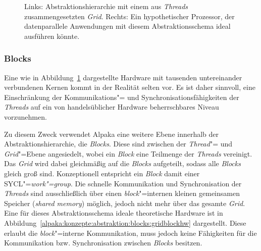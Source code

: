\begin{figure}
    \caption{Links: Abstraktionshierarchie mit einem aus \textit{Threads}
             zusammengesetzten \textit{Grid}. Rechts: Ein hypothetischer
             Prozessor, der datenparallele Anwendungen mit diesem
             Abstraktionsschema ideal ausführen könnte.
             \cite[nach][18]{worpitz2015}}
    \label{alpaka:konzepte:abstraktion:threads:gridthreadhw}
\end{figure}

\subsubsection{Blocks}

Eine wie in Abbildung~\ref{alpaka:konzepte:abstraktion:threads:gridthreadhw}
dargestellte Hardware mit tausenden untereinander verbundenen Kernen kommt
in der Realität selten vor. Es ist daher sinnvoll, eine Einschränkung der
Kommunikations"= und Synchronisationsfähigkeiten der \textit{Threads} auf ein
von handelsüblicher Hardware beherrschbares Niveau vorzunehmen.

Zu diesem Zweck verwendet Alpaka eine weitere Ebene innerhalb der
Abstraktionshierarchie, die \textit{Blocks}. Diese sind zwischen der
\textit{Thread}"= und \textit{Grid}"=Ebene angesiedelt, wobei ein \textit{Block}
eine Teilmenge der \textit{Threads} vereinigt. Das \textit{Grid} wird dabei
gleichmäßig auf die \textit{Blocks} aufgeteilt, sodass alle \textit{Blocks}
gleich groß sind. Konzeptionell entspricht ein \textit{Block} damit einer
SYCL"=\textit{work"=group}. Die schnelle Kommunikation und Synchronisation der
\textit{Threads} sind ausschließlich über einen \textit{block}"=internen kleinen
gemeinsamen Speicher (\textit{shared memory}) möglich, jedoch nicht mehr über
das gesamte \textit{Grid}. Eine für dieses Abstraktionsschema ideale
theoretische Hardware ist in
Abbildung~\ref{alpaka:konzepte:abstraktion:blocks:gridblockhw} dargestellt.
Diese erlaubt die \textit{block}"=interne Kommunikation, muss jedoch keine
Fähigkeiten für die Kommunikation bzw. Synchronisation zwischen \textit{Blocks}
besitzen.

